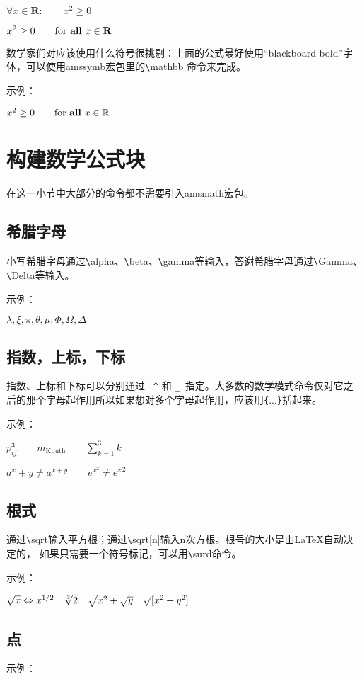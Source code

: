 \documentclass[UTF8]{ctexart}
\begin{document}
$\forall x \in \mathbf{R}:\qquad x^{2} \geq 0$


$x^{2} \geq 0 \qquad
\text{for \textbf{all} }
x\in\mathbf{R}$

数学家们对应该使用什么符号很挑剔：上面的公式最好使用``blackboard bold”字体，可以使用amssymb宏包里的\texttt{\textbackslash}mathbb
命令来完成。

示例：

$x^{2} \geq 0 \qquad
\text{for \textbf{all} }
x\in\mathbb{R}$

\section{构建数学公式块}
在这一小节中大部分的命令都不需要引入amsmath宏包。
\subsection{希腊字母}
小写希腊字母通过\texttt{\textbackslash}alpha、\texttt{\textbackslash}beta、\texttt{\textbackslash}gamma等输入，答谢希腊字母通过\texttt{\textbackslash}Gamma、\texttt{\textbackslash}Delta等输入。

示例：

$\lambda, \xi, \pi, \theta, \mu, \Phi, \Omega, \Delta$
\subsection{指数，上标，下标}
指数、上标和下标可以分别通过 \texttt{~\^} 和 \texttt{\_ }指定。大多数的数学模式命令仅对它之后的那个字母起作用所以如果想对多个字母起作用，应该用\texttt{\{}...\texttt{\}}括起来。

示例：

$p^3_{ij} \qquad m_\text{Knuth}\qquad \sum_{k=1}^3 k$

$a^x+y \neq a^{x+y}\qquad e^{x^2} \neq {e^x}^2$

\subsection{根式}
通过\texttt{\textbackslash}sqrt输入平方根；通过\texttt{\textbackslash}sqrt[n]输入n次方根。根号的大小是由\LaTeX 自动决定的，
如果只需要一个符号标记，可以用\texttt{\textbackslash}surd命令。

示例：

$\sqrt{x} \Leftrightarrow x^{1/2} \quad \sqrt[3]{2} \quad \sqrt{x^{2} + \sqrt{y}}
\quad \surd[x^2 +y^2]$
\subsection{点}
示例：
\end{document}
